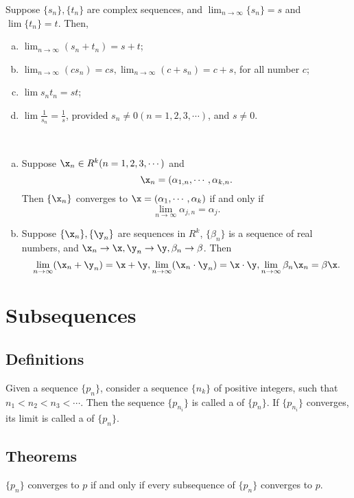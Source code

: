 \begin{thm}
	Suppose $\{s_n\}, \{t_n\}$ are complex sequences, and $\lim_{n \to \infty} \{s_n\} = s$ and $\lim \{t_n\} = t$. Then,
	\begin{enumerate}[(a)]
		\item $\lim_{n \to \infty} (s_n + t_n) = s + t$;
		\item $\lim_{n \to \infty} (cs_n) = cs, \lim_{n \to \infty} (c+s_n) = c + s$, for all number $c$;		
		\item $\lim s_n t_n = st$;
		\item $\lim \frac{1}{s_n} = \frac{1}{s}$, provided $s_n \ne 0 (n=1,2,3,\cdots)$, and $s \ne 0$.
	\end{enumerate}	
\end{thm}

\begin{thm}
	~
	\begin{enumerate}[(a)]
		\item Suppose $\x_n \in R^k (n=1,2,3,\cdots)$ and $$\x_n = (\alpha_{1,n}, \cdots, \alpha_{k,n}.$$ Then $\{\x_n\}$ converges to $\x=(\alpha_1,\cdots,\alpha_k)$ if and only if $$\lim_{n \to \infty} \alpha_{j,n} = \alpha_j.$$
		\item Suppose $\{\x_n\},\{\y_n\}$ are sequences in $R^k$, $\{\beta_n\}$ is a sequence of real numbers, and $\x_n \to \x, \y_n \to \y, \beta_n \to \beta$. Then $$\lim_{n \to \infty} (\x_n+\y_n) = \x + \y, \lim_{n \to \infty} (\x_n \cdot \y_n) = \x \cdot \y, \lim_{n \to \infty} \beta_n \x_n = \beta \x.$$
	\end{enumerate}
\end{thm}


\section{Subsequences}
\subsection{Definitions}
\begin{deff}\label{def:sublim}
	Given a sequence $\{p_n\}$, consider a sequence $\{n_k\}$ of positive integers, such that $n_1 < n_2 < n_3 < \cdots$. Then the sequence $\{p_{n_i}\}$ is called a {} of $\{p_n\}$. If $\{p_{n_i}\}$ converges, its limit is called a {} of $\{p_n\}$.
\end{deff}

\subsection{Theorems}
\begin{thm}
	$\{p_n\}$ converges to $p$ if and only if every subsequence of $\{p_n\}$ converges to $p$.
\end{thm}


